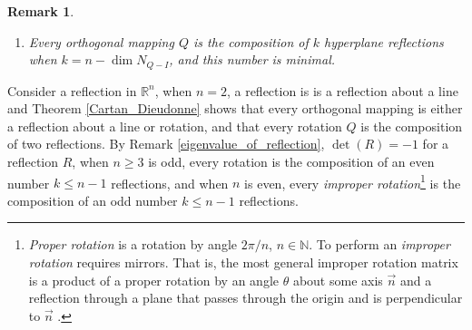 \documentclass[11pt]{book}
\newtheorem{remark}{Remark}[chapter]
\theoremstyle{definition}
\numberwithin{equation}{chapter}
\begin{document}
\begin{subappendices}
\begin{remark}
\begin{enumerate}[label=(\alph*)]
    If $1$ is not an  eigenvalue of $R$, then $R$ is the composition of $k \leq n$ reflections about hyperplanes $H, F_1, \cdots, F_{k-1}$, such that $F_i = H \oplus L$, where $L$ is a line intersecting $H$ and  $H_i$ are subspaces of dimension $n - 2$ that are orthogonal to $L$. 
    
    \item Every orthogonal mapping $Q$ is the composition of $k$ hyperplane reflections when $k = n - \dim  N_{Q-I}$, and this number is minimal. 
\end{enumerate}
\end{remark}

\medskip

Consider a reflection in $\mathbb{R}^n$, when $n = 2$, a reflection is is a reflection about a line and Theorem \ref{Cartan_Dieudonne} shows that every orthogonal mapping is either a reflection about a line or rotation, and that every rotation $Q$ is the composition of two reflections. By Remark \ref{eigenvalue_of_reflection}, $\det (R) = -1$ for a reflection $R$, when $n \geq 3$ is odd, every rotation is the composition of an even number $k \leq n - 1$ reflections, and when $n$ is even, every {\em improper rotation}\footnote{{\em Proper rotation} is a rotation by angle $2\pi/n$, $n \in \mathbb{N}$. To perform an {\em improper rotation} requires mirrors. That is, the most general improper rotation matrix is a product of a proper rotation by an angle $\theta$ about some axis $\vec{n}$ and a reflection through a plane that passes through the origin and is perpendicular to $\vec{n}$ \cite{36}.} is the composition of an odd number $k \leq n - 1$ reflections.


\end{subappendices}
\end{document}
